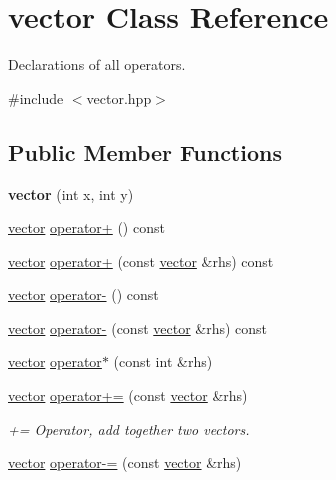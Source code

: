 \hypertarget{classvector}{}\section{vector Class Reference}
\label{classvector}


Declarations of all operators.  




{\ttfamily \#include $<$vector.\+hpp$>$}

\subsection*{Public Member Functions}
\begin{DoxyCompactItemize}
\item 
{\bfseries vector} (int x, int y)\hypertarget{classvector_a7fa147d3199381b9d8b32753bd1a6968}{}\label{classvector_a7fa147d3199381b9d8b32753bd1a6968}

\item 
\hyperlink{classvector}{vector} \hyperlink{classvector_a45841e6143c208ca3bca6a5bdc0e5c68}{operator+} () const 
\item 
\hyperlink{classvector}{vector} \hyperlink{classvector_a2ab7f62262c6f0c6ade3bd1879e6001e}{operator+} (const \hyperlink{classvector}{vector} \&rhs) const 
\item 
\hyperlink{classvector}{vector} \hyperlink{classvector_a76c9828af6fbf6d389ef75e20270efed}{operator-\/} () const 
\item 
\hyperlink{classvector}{vector} \hyperlink{classvector_ad9596a53b6aef33bbddfa7b9b4b17f09}{operator-\/} (const \hyperlink{classvector}{vector} \&rhs) const 
\item 
\hyperlink{classvector}{vector} \hyperlink{classvector_ac4cc1a334af3576736c08768329dd886}{operator$\ast$} (const int \&rhs)
\item 
\hyperlink{classvector}{vector} \hyperlink{classvector_ad62f9ffeab2c2b5963ca90092b89d525}{operator+=} (const \hyperlink{classvector}{vector} \&rhs)\hypertarget{classvector_ad62f9ffeab2c2b5963ca90092b89d525}{}\label{classvector_ad62f9ffeab2c2b5963ca90092b89d525}

\begin{DoxyCompactList}\small\item\em += Operator, add together two vectors. \end{DoxyCompactList}\item 
\hyperlink{classvector}{vector} \hyperlink{classvector_a3e73e3ef763da682e157866d641b9c33}{operator-\/=} (const \hyperlink{classvector}{vector} \&rhs)\hypertarget{classvector_a3e73e3ef763da682e157866d641b9c33}{}\label{classvector_a3e73e3ef763da682e157866d641b9c33}


\end{DoxyCompactItemize}
